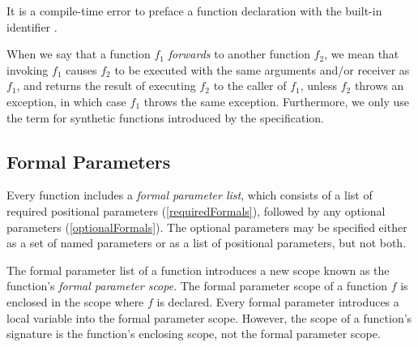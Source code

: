 \documentclass{article}
\newcommand{\code}[1]{{\sf #1}}
\begin{document}

\LMHash{}
It is a compile-time error to preface a function declaration with the built-in identifier \STATIC{}.

\LMHash{}
When we say that a function $f_1$ {\em forwards} to another function $f_2$, we mean that  invoking $f_1$ causes $f_2$ to  be executed with the same arguments and/or receiver as $f_1$, and returns the result of executing $f_2$ to the caller of $f_1$, unless $f_2$ throws an exception, in which case $f_1$ throws the same exception. Furthermore, we only use the term for synthetic functions introduced by the specification.


\subsection{Formal Parameters}

\LMHash{}
Every function includes a {\em formal parameter list}, which consists of a list of required positional parameters (\ref{requiredFormals}), followed by any optional parameters (\ref{optionalFormals}). The optional parameters may be specified either as a set of named parameters or as a list of positional parameters, but not both.

\LMHash{}
The formal parameter list of a function introduces a new scope known as the function's {\em formal parameter scope}. The formal parameter scope of a function $f$  is enclosed in the scope where $f$ is declared.   Every formal parameter introduces a local variable into the formal parameter scope. However, the scope of a function's signature is the function's enclosing scope, not the formal parameter scope.
\end{document}
